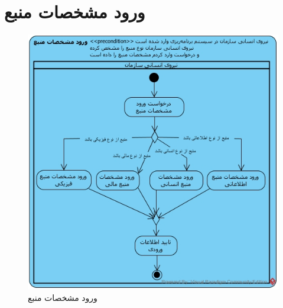 \section{ورود مشخصات منبع}
\begin{figure}[H]
	\centering
	\includegraphics[scale=0.8]{img/activity/EnterResourceAttributes}
	\caption{ورود مشخصات منبع}
\end{figure}